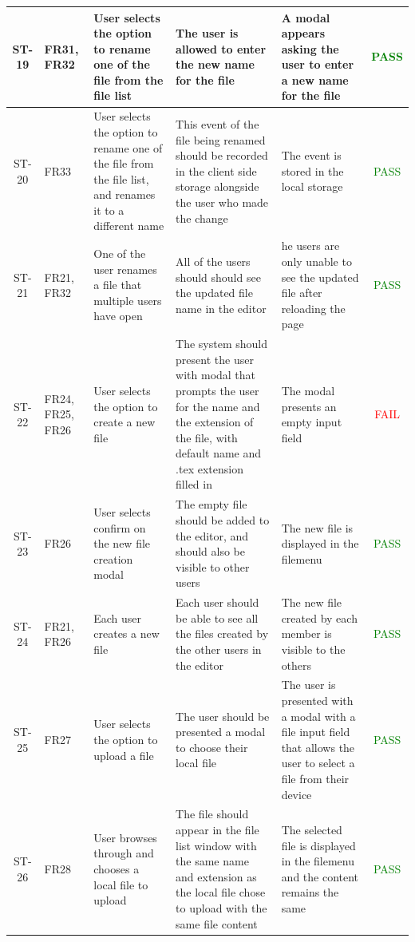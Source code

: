 \documentclass[12pt, titlepage]{article}
\begin{document}
\begin{center}
\begin{longtable}{|c|p{1cm}|p{2.7cm}|p{3cm}|p{3cm}|c|}
			\hline
			ST-19 & FR31, FR32 & User selects the option to rename one of the file from the file list & The user is allowed to enter the new name for the file & A modal appears asking the user to enter a new name for the file & \textcolor{green}{PASS} \\
			\hline
			ST-20 & FR33 & User selects the option to rename one of the file from the file list, and renames it to a different name & This event of the file being renamed should be recorded in the client side storage alongside the user who made the change & The event is stored in the local storage & \textcolor{green}{PASS}  \\
			\hline
			ST-21 & FR21, FR32 & One of the user renames a file that multiple users have open & All of the users should should see the updated file name in the editor & he users are only unable to see the updated file after reloading the page & \textcolor{green}{PASS} \\
			\hline
			ST-22 & FR24, FR25, FR26 & User selects the option to create a new file & The system should present the user with modal that prompts the user for the name and the extension of the file, with default name and .tex extension filled in & The modal presents an empty input field &  \textcolor{red}{FAIL} \\
			\hline
			ST-23 & FR26 & User selects confirm on the new file creation modal & The empty file should be added to the editor, and should also be visible to other users & The new file is displayed in the filemenu &  \textcolor{green}{PASS} \\
			\hline
			ST-24 & FR21, FR26 & Each user creates a new file & Each user should be able to see all the files created by the other users in the editor & The new file created by each member is visible to the others & \textcolor{green}{PASS}  \\
			\hline
			ST-25 & FR27 &  User selects the option to upload a file & The user should be presented a modal to choose their local file & The user is presented with a modal with a file input field that allows the user to select a file from their device &  \textcolor{green}{PASS}  \\
			\hline
			ST-26 & FR28 & User browses through and chooses a local file to upload & The file should appear in the file list window with the same name and extension as the local file chose to upload with the same file content & The selected file is displayed in the filemenu and the content remains the same & \textcolor{green}{PASS} \\

\end{longtable}
\end{center}
\end{document}

